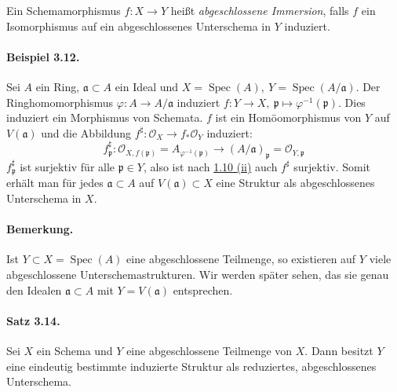 Ein Schemamorphismus $f:X\to Y$ heißt \textit{abgeschlossene Immersion}, falls $f$ ein Isomorphismus auf ein abgeschlossenes Unterschema in $Y$ induziert.

\paragraph{Beispiel 3.12.}\label{3.12} Sei $A$ ein Ring, $\mathfrak{a}\subset A$ ein Ideal und $X=\operatorname{Spec}(A),\ Y=\operatorname{Spec}(A/\mathfrak{a})$. Der Ringhomomorphismus $\varphi:A\to A/\mathfrak{a}$ induziert $f:Y\to X,\ \mathfrak{p}\mapsto\varphi^{-1}(\mathfrak{p})$. Dies induziert ein Morphismus von Schemata. $f$ ist ein Homöomorphismus von $Y$ auf $V(\mathfrak{a})$ und die Abbildung $f^\sharp:\mathcal{O}_X\to f_\ast\mathcal{O}_Y$ induziert:
\[f_\mathfrak{p}^\sharp:\mathcal{O}_{X, f(\mathfrak{p})}=A_{\varphi^{-1}(\mathfrak{p})}\to (A/\mathfrak{a})_\mathfrak{p}=\mathcal{O}_{Y,\mathfrak{p}}\]
$f_\mathfrak{p}^\sharp$ ist surjektiv für alle $\mathfrak{p}\in Y$, also ist nach \hyperref[1.10]{1.10 (ii)} auch $f^\sharp$ surjektiv. Somit erhält man für jedes $\mathfrak{a}\subset A$ auf $V(\mathfrak{a})\subset X$ eine Struktur als abgeschlossenes Unterschema in $X$.

\paragraph{Bemerkung.} Ist $Y\subset X=\operatorname{Spec}(A)$ eine abgeschlossene Teilmenge, so existieren auf $Y$ viele abgeschlossene Unterschemastrukturen. Wir werden später sehen, das sie genau den Idealen $\mathfrak{a}\subset A$ mit $Y=V(\mathfrak{a})$ entsprechen.

\paragraph{Satz 3.14.}\label{3.14} Sei $X$ ein Schema und $Y$ eine abgeschlossene Teilmenge von $X$. Dann besitzt $Y$ eine eindeutig bestimmte induzierte Struktur als reduziertes, abgeschlossenes Unterschema.

\iffalse
